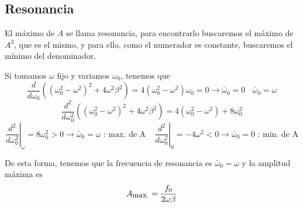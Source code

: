 \subsection{Resonancia}
El máximo de $A$ se llama resonancia, para encontrarlo buscaremos el máximo de $A^2$, que es el mismo, y para ello, como el numerador es constante, buscaremos el mínimo del denominador.

Si tomamos $\omega$ fijo y variamos $\omega_0$, tenemos que
\begin{equation} \label{6.1.1}
    \frac{d}{d \omega_0} \left(\left(\omega_0^2 -\omega^2\right)^2+4\omega^2 \beta^2\right) = 4\left(\omega_0^2 -\omega^2\right) \omega_0 = 0   \rightarrow \bar{\omega}_0 = 0 \ \ \ \ \bar{\omega}_0 = \omega
\end{equation}
\[
    \frac{d^2}{d \omega_0^2} \left(\left(\omega_0^2 -\omega^2\right)^2+4\omega^2 \beta^2\right) = 4\left(\omega_0^2 -\omega^2\right) + 8\omega_0^2
\]
\begin{equation} \label{6.1.1}
    \left.\frac{d^2}{d \omega_0^2}\right|_\omega = 8\omega_0^2 > 0 \rightarrow \bar{\omega}_0 = \omega \mbox{ : max. de A} \ \ \ \ \ \left.\frac{d^2}{d \omega_0^2}\right|_0 = -4\omega^2 < 0 \rightarrow  \bar{\omega}_0 = 0 \mbox{ : min. de A} 
\end{equation}

De esta forma, tenemos que la frecuencia de resonancia es $\bar{\omega}_0 = \omega$ y la amplitud máxima es
\begin{equation} \label{6.1.1}
    A_{\mbox{\small max.}} = \frac{f_0}{2\omega \beta}
\end{equation}

